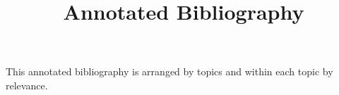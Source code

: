 \documentclass{article}[12pt]
\title{Annotated Bibliography}
\date{}
\begin{document}
\setcounter{page}{35}
\maketitle
This annotated bibliography is arranged by topics and within each topic by relevance.


\nocite{*}


\end{document}
